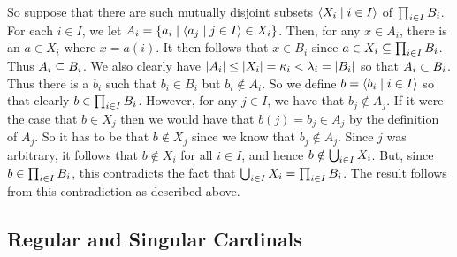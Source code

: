 \begin{questions}
{{      So suppose that there are such mutually disjoint subsets $\angles{X_i \where i \in I}$ of $\prodi B_i$.
      For each $i \in I$, we let $A_i = \braces{a_i \where \angles{a_j \where j \in I} \in X_i}$.
      Then, for any $x \in A_i$, there is an $a \in X_i$ where $x = a(i)$.
      It then follows that $x \in B_i$ since $a \in X_i \ss \prodi B_i$.
      Thus $A_i \ss B_i$.
      We also clearly have $\abs{A_i} \leq \abs{X_i} = \k_i < \l_i = \abs{B_i}$ so that $A_i \pss B_i$.
      Thus there is a $b_i$ such that $b_i \in B_i$ but $b_i \notin A_i$.
      So we define $b = \angles{b_i \where i \in I}$ so that clearly $b \in \prodi B_i$.
      However, for any $j \in I$, we have that $b_j \notin A_j$.
      If it were the case that $b \in X_j$ then we would have that $b(j) = b_j \in A_j$ by the definition of $A_j$.
      So it has to be that $b \notin X_j$ since we know that $b_j \notin A_j$.
      Since $j$ was arbitrary, it follows that $b \notin X_i$ for all $i \in I$, and hence $b \notin \uni X_i$.
      But, since $b \in \prodi B_i$, this contradicts the fact that $\uni X_i = \prodi B_i$.
      The result follows from this contradiction as described above.
    }
  }

  \subsection{Regular and Singular Cardinals}


\end{questions}

